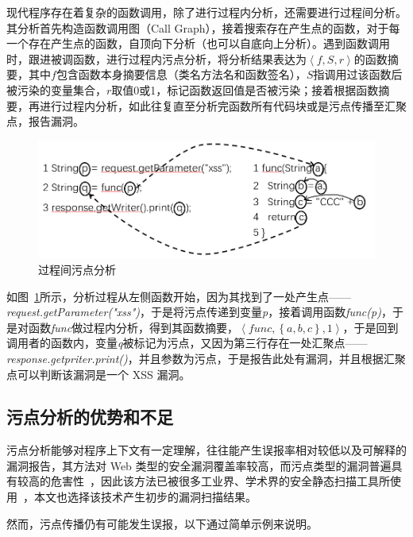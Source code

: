现代程序存在着复杂的函数调用，除了进行过程内分析，还需要进行过程间分析。其分析首先构造函数调用图（Call Graph），接着搜索存在产生点的函数，对于每一个存在产生点的函数，自顶向下分析（也可以自底向上分析）。遇到函数调用时，跟进被调函数，进行过程内污点分析，将分析结果表达为$\left\langle f, S, r\right\rangle$的函数摘要，其中$f$包含函数本身摘要信息（类名方法名和函数签名），$S$指调用过该函数后被污染的变量集合，$r$取值0或1，标记函数返回值是否被污染；接着根据函数摘要，再进行过程内分析，如此往复直至分析完函数所有代码块或是污点传播至汇聚点，报告漏洞。

\begin{figure}[!htbp]
	\centering
	\includegraphics[width=0.7\linewidth]{FIGs/chapter2/external_taintflow.png}
	\caption{过程间污点分析}\label{externalflow}
\end{figure}

如图~\ref{externalflow}所示，分析过程从左侧函数开始，因为其找到了一处产生点——\textit{request.getParameter("xss")}，于是将污点传递到变量\textit{p}，接着调用函数\textit{func(p)}，于是对函数\textit{func}做过程内分析，得到其函数摘要，$\left\langle func, \left\{a, b, c\right\}, 1\right\rangle$，于是回到调用者的函数内，变量\textit{q}被标记为污点，又因为第三行存在一处汇聚点——\textit{response.getpriter.print()}，并且参数为污点，于是报告此处有漏洞，并且根据汇聚点可以判断该漏洞是一个 XSS 漏洞。\\

\subsection{污点分析的优势和不足}
污点分析能够对程序上下文有一定理解，往往能产生误报率相对较低以及可解释的漏洞报告，其方法对 Web 类型的安全漏洞覆盖率较高，而污点类型的漏洞普遍具有较高的危害性~\cite{taintStyle,aletheia}，因此该方法已被很多工业界、学术界的安全静态扫描工具所使用~\cite{taintStyle,taint:taj,pixy}，本文也选择该技术产生初步的漏洞扫描结果。

然而，污点传播仍有可能发生误报，以下通过简单示例来说明。


